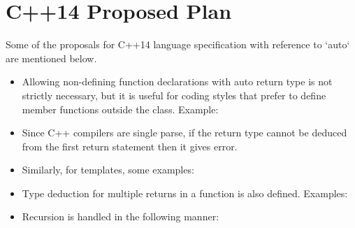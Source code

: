 \section{C++14 Proposed Plan}
Some of the proposals for C++14 language specification with reference to `auto` are mentioned below. 
\begin{itemize}
\item Allowing non-defining function declarations with auto return type is not strictly necessary, but it is useful for coding styles that prefer to define member functions outside the class. Example:
\item Since C++ compilers are single parse, if the return type cannot be deduced from the first return statement then it gives error. 
\item Similarly, for templates, some examples: 
\item Type deduction for multiple returns in a function is also defined. Examples: 
\item Recursion is handled in the following manner:
\end{itemize}
